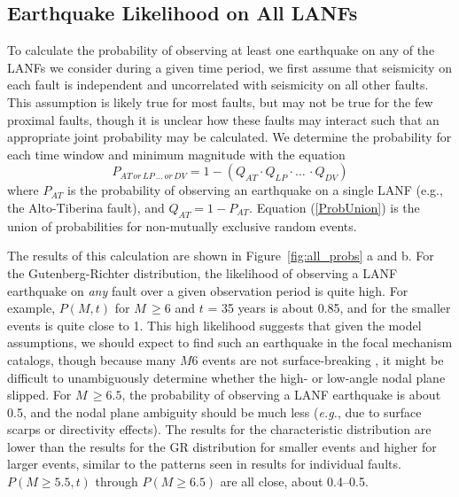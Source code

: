 \documentclass[twocolumn,grl]{AGUTeX}
\begin{document}
\begin{article}
\subsection{Earthquake Likelihood on All LANFs}
To calculate the probability of observing at least one earthquake on any of the LANFs we consider during a given time period, we first assume that seismicity on
each fault is independent and uncorrelated with seismicity on all
other faults. This assumption is likely true for most faults, but may
not be true for the few proximal faults,
though it is unclear how these faults may interact 
such that an appropriate joint probability may be calculated. 
We determine the probability for each time window and minimum magnitude
with the equation
\begin{equation}
P_{AT \, or \, LP\, \ldots \, or \, DV} = 1 - (Q_{AT} \cdot Q_{LP} \cdot \ldots \, \cdot Q_{DV})
\label{ProbUnion}
\end{equation}
where $P_{AT}$ is the probability of observing an earthquake on a
single LANF (e.g., the Alto-Tiberina fault), and $Q_{AT} = 1 -
P_{AT}$. Equation (\ref{ProbUnion}) is the union of probabilities for
non-mutually exclusive random events.

The results of this calculation are shown in Figure~\ref{fig:all_probs} a and b.
For the Gutenberg-Richter distribution, the likelihood of observing a LANF
earthquake on \emph{any} fault over a given observation period is quite high.
For example, $P(M,t)$ for $M \, \ge 6$ and $t$ = 35 years is about 0.85, and
for the smaller events is quite close to 1.
This high likelihood suggests that given the model assumptions, we should
expect to find such an earthquake in the focal mechanism catalogs, though
because many $M6$ events are not surface-breaking \citep{hecker2013eqdist}, it
might be difficult to unambiguously determine whether the high- or low-angle
nodal plane slipped.
For $M \, \ge 6.5$, the probability of observing a LANF earthquake is about 
0.5, and the nodal plane ambiguity should be much less ({\it e.g.}, due to
surface scarps or directivity effects).
The results for the characteristic distribution are lower than the results
for the GR distribution for smaller events
and higher for larger events, similar to the patterns seen in results 
for individual faults. $P(M\ge5.5,t)$ through $P(M\ge6.5)$ are all
close, about 0.4--0.5.  



\end{article}
\end{document}
